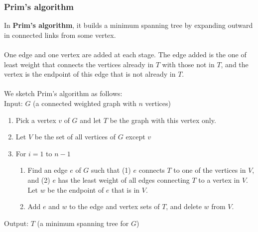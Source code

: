 \documentclass[a4paper]{article}
\begin{document}
\subsubsection{Prim's algorithm}
In \textbf{Prim's algorithm}, it builds a minimum spanning tree by expanding outward in connected links from some vertex.\\\\
One edge and one vertex are added at each stage. The edge added is the one of least weight that connects the vertices already in $T$ with those not in $T$, and the vertex is the endpoint of this edge that is not already in $T$.\\\\
We sketch Prim's algorithm as follows:\\
Input: $G$ (a connected weighted graph with $n$ vertices)
\begin{enumerate}
	\item Pick a vertex $v$ of $G$ and let $T$ be the graph with this vertex only.
	\item Let $V$ be the set of all vertices of $G$ except $v$
	\item For $i=1$ to $n-1$
	\begin{enumerate}
		\item Find an edge $e$ of $G$ such that (1) $e$ connects $T$ to one of the vertices in $V$, and (2) $e$ has the least weight of all edges connecting $T$ to a vertex in $V$. Let $w$ be the endpoint of $e$ that is in $V$.
		\item Add $e$ and $w$ to the edge and vertex sets of $T$, and delete $w$ from $V$.
	\end{enumerate}
\end{enumerate}
Output: $T$ (a minimum spanning tree for $G$)
\end{document}
